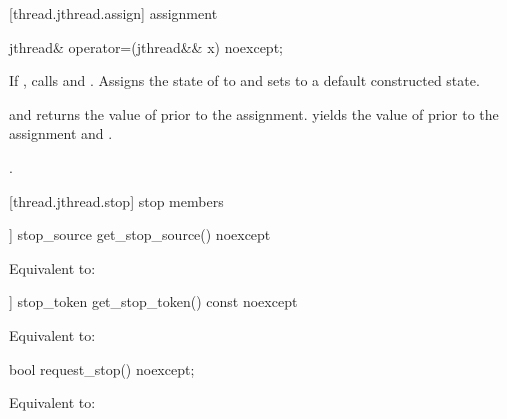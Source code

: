 [thread.jthread.assign]{ assignment}

%
\begin{itemdecl}
jthread& operator=(jthread&& x) noexcept;
\end{itemdecl}

\begin{itemdescr}
\pnum
\effects If , calls  and .
Assigns the
state of  to  and sets  to a default constructed state.

{\color{diffcolor}
\pnum
\postconditions {} and  returns the value of
 prior to the assignment.
 yields the value of  prior to the assignment
and .
}%

\pnum
\returns {}.
\end{itemdescr}


[thread.jthread.stop]{ stop members}

{\color{diffcolor}
%
\begin{itemdecl}
[[nodiscard]] stop_source get_stop_source() noexcept
\end{itemdecl}
\begin{itemdescr}
  \pnum\effects Equivalent to: 
\end{itemdescr}

%
\begin{itemdecl}
[[nodiscard]] stop_token get_stop_token() const noexcept
\end{itemdecl}
\begin{itemdescr}
  \pnum\effects Equivalent to: 
\end{itemdescr}

%
\begin{itemdecl}
bool request_stop() noexcept;
\end{itemdecl}
\begin{itemdescr}
  \pnum\effects Equivalent to: 
\end{itemdescr}
}%

